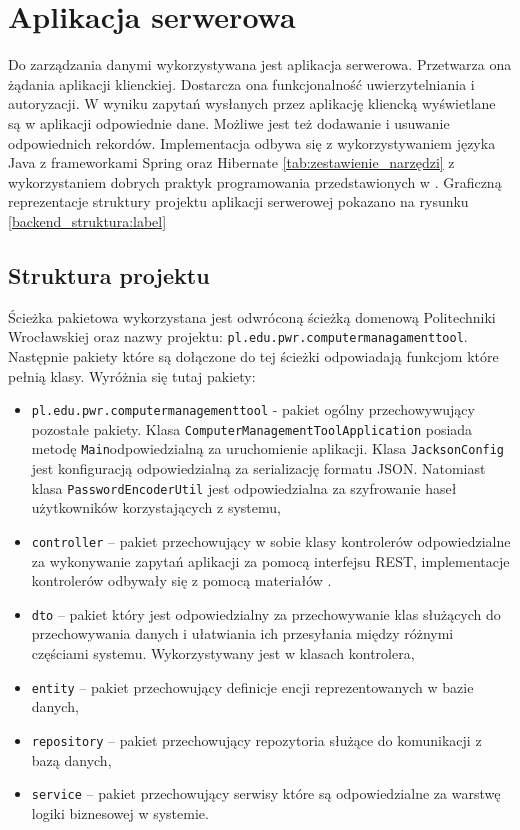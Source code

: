 \section{Aplikacja serwerowa}
Do zarządzania danymi wykorzystywana jest aplikacja serwerowa. Przetwarza ona żądania aplikacji klienckiej. Dostarcza ona funkcjonalność uwierzytelniania i autoryzacji. W wyniku zapytań wysłanych przez aplikację kliencką wyświetlane są w aplikacji odpowiednie dane. Możliwe jest też dodawanie i usuwanie odpowiednich rekordów. Implementacja odbywa się z wykorzystywaniem języka Java z frameworkami Spring oraz Hibernate \ref{tab:zestawienie_narzędzi} z wykorzystaniem dobrych praktyk programowania przedstawionych w \cite{javaep}. Graficzną reprezentacje struktury projektu aplikacji serwerowej pokazano na rysunku \ref{backend_struktura:label}

\subsection{Struktura projektu}
Ścieżka pakietowa wykorzystana jest odwróconą ścieżką domenową Politechniki Wrocławskiej oraz nazwy projektu: \texttt{pl.edu.pwr.computermanagamenttool}. Następnie pakiety które są dołączone do tej ścieżki odpowiadają funkcjom które pełnią klasy. Wyróżnia się tutaj pakiety:
\begin{itemize} %
\item \texttt{pl.edu.pwr.computermanagementtool} - pakiet ogólny przechowywujący pozostałe pakiety. Klasa \texttt{ComputerManagementToolApplication} posiada metodę \texttt{Main}odpowiedzialną za uruchomienie aplikacji. Klasa \texttt{JacksonConfig} jest konfiguracją odpowiedzialną za serializację formatu JSON. Natomiast klasa \texttt{PasswordEncoderUtil} jest odpowiedzialna za szyfrowanie haseł użytkowników korzystających z systemu,
\item \texttt{controller} -- pakiet przechowujący w sobie klasy kontrolerów odpowiedzialne za wykonywanie zapytań aplikacji za pomocą interfejsu REST, implementacje kontrolerów odbywały się z pomocą materiałów \cite{springrest, javarest}.
\item \texttt{dto} -- pakiet który jest odpowiedzialny za przechowywanie klas służących do przechowywania danych i ułatwiania ich przesyłania między różnymi częściami systemu. Wykorzystywany jest w klasach kontrolera,
\item \texttt{entity} -- pakiet przechowujący definicje encji reprezentowanych w bazie danych,
\item \texttt{repository} -- pakiet przechowujący repozytoria służące do komunikacji z bazą danych,
\item \texttt{service} -- pakiet przechowujący serwisy które są odpowiedzialne za warstwę logiki biznesowej w systemie.
\end{itemize}


